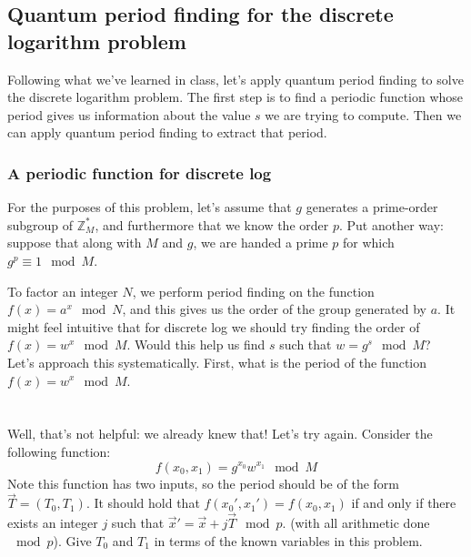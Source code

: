 \newpage
\subsection{Quantum period finding for the discrete logarithm problem}
Following what we've learned in class, let's apply quantum period finding to solve the discrete logarithm problem. The first step is to find a periodic function whose period gives us information about the value $s$ we are trying to compute. Then we can apply quantum period finding to extract that period.

\subsubsection{A periodic function for discrete log}
For the purposes of this problem, let's assume that $g$ generates a prime-order subgroup of $\mathbb{Z}^*_M$, and furthermore that we know the order $p$. Put another way: suppose that along with $M$ and $g$, we are handed a prime $p$ for which $g^p \equiv 1 \mod M$.

To factor an integer $N$, we perform period finding on the function $f(x) = a^x \mod N$, and this gives us the order of the group generated by $a$. It might feel intuitive that for discrete log we should try finding the order of $f(x) = w^x \mod M$. Would this help us find $s$ such that $w = g^s \mod M$?  \\

Let's approach this systematically. First, what is the period of the function $f(x) = w^x \mod M$. \\

\noindent{} \\\\


Well, that's not helpful: we already knew that! Let's try again. Consider the following function:
\begin{equation}
    f(x_0,x_1) = g^{x_0}w^{x_1} \mod M
\end{equation}
Note this function has two inputs, so the period should be of the form $\vec{T} = (T_0,T_1)$. It should hold that $f(x_0',x_1') = f(x_0,x_1)$ if and only if there exists an integer $j$ such that $\vec{x}' = \vec{x} + j \vec{T} \mod p$. (with all arithmetic done $\mod p$). Give $T_0$ and $T_1$ in terms of the known variables in this problem.

